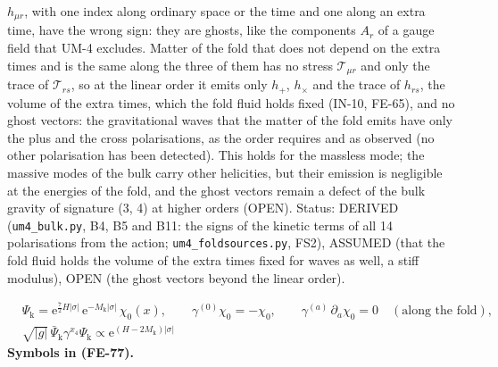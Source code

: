 \documentclass[
  10pt,
]{article}
\begin{document}
\(h_{\mu r}\), with one index along ordinary space or the time and one
along an extra time, have the wrong sign: they are ghosts, like the
components \(A_r\) of a gauge field that UM-4 excludes. Matter of the
fold that does not depend on the extra times and is the same along the
three of them has no stress \(\mathcal{T}_{\mu r}\) and only the trace
of \(\mathcal{T}_{rs}\), so at the linear order it emits only \(h_{+}\),
\(h_{\times}\) and the trace of \(h_{rs}\), the volume of the extra
times, which the fold fluid holds fixed (IN-10, FE-65), and no ghost
vectors: the gravitational waves that the matter of the fold emits have
only the plus and the cross polarisations, as the order requires and as
observed (no other polarisation has been detected). This holds for the
massless mode; the massive modes of the bulk carry other helicities, but
their emission is negligible at the energies of the fold, and the ghost
vectors remain a defect of the bulk gravity of signature (3, 4) at
higher orders (OPEN). Status: DERIVED (\texttt{um4\_bulk.py}, B4, B5 and
B11: the signs of the kinetic terms of all 14 polarisations from the
action; \texttt{um4\_foldsources.py}, FS2), ASSUMED (that the fold fluid
holds the volume of the extra times fixed for waves as well, a stiff
modulus), OPEN (the ghost vectors beyond the linear order).

\[
\begin{aligned}
&\Psi_{\mathrm{k}} = \mathrm{e}^{\frac72H\lvert\sigma\rvert}\,\mathrm{e}^{-M_{\mathrm{k}}\lvert\sigma\rvert}\,\chi_0(x),\qquad
\gamma^{(0)}\chi_0 = -\chi_0,\qquad \gamma^{(a)}\,\partial_a\chi_0 = 0\quad(\text{along the fold}),\\
&\sqrt{\lvert g\rvert}\,\bar\Psi_{\mathrm{k}}\gamma^{x_4}\Psi_{\mathrm{k}} \propto \mathrm{e}^{(H - 2M_{\mathrm{k}})\lvert\sigma\rvert}
\end{aligned} \tag{FE-77}
\] \textbf{Symbols in (FE-77).}
\end{document}
